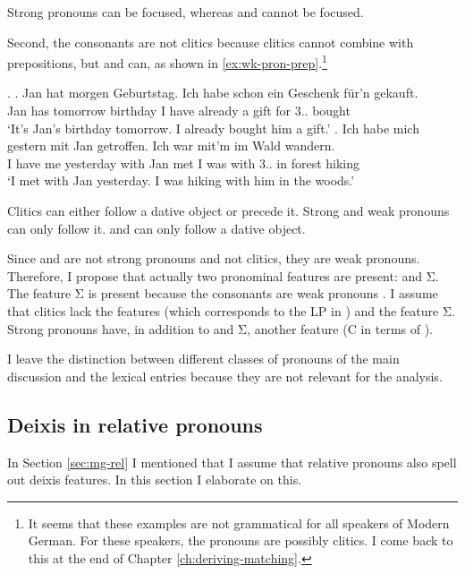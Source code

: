 Strong pronouns can be focused, whereas  and  cannot be focused.

Second, the consonants are not clitics because clitics cannot combine with prepositions, but  and  can, as shown in \ref{ex:wk-pron-prep}.\footnote{
It seems that these examples are not grammatical for all speakers of Modern German. For these speakers, the pronouns are possibly clitics. I come back to this at the end of Chapter \ref{ch:deriving-matching}.
}

\ex.\label{ex:wk-pron-prep}
\ag. Jan hat morgen Geburtstag. Ich habe schon ein Geschenk für'n gekauft.\\
 Jan has tomorrow birthday I have already a gift {for 3..} bought\\
 `It's Jan's birthday tomorrow. I already bought him a gift.'
\bg. Ich habe mich gestern mit Jan getroffen. Ich war mit'm im Wald wandern.\\
 I have me yesterday with Jan met I was {with 3..} in forest hiking\\
 `I met with Jan yesterday. I was hiking with him in the woods.'

Clitics can either follow a dative object or precede it. Strong and weak pronouns can only follow it.  and  can only follow a dative object.

Since  and  are not strong pronouns and not clitics, they are weak pronouns.
Therefore, I propose that actually two pronominal features are present:  and Σ. The feature Σ is present because the consonants are weak pronouns \citep{cardinaletti1994}.
I assume that clitics lack the features  (which corresponds to the LP in ) and the feature Σ. Strong pronouns have, in addition to  and Σ, another feature (C in terms of ).

I leave the distinction between different classes of pronouns of the main discussion and the lexical entries because they are not relevant for the analysis.


\subsection{Deixis in relative pronouns}\label{sec:deixis-rp}

In Section \ref{sec:mg-rel} I mentioned that I assume that relative pronouns also spell out deixis features. In this section I elaborate on this.

